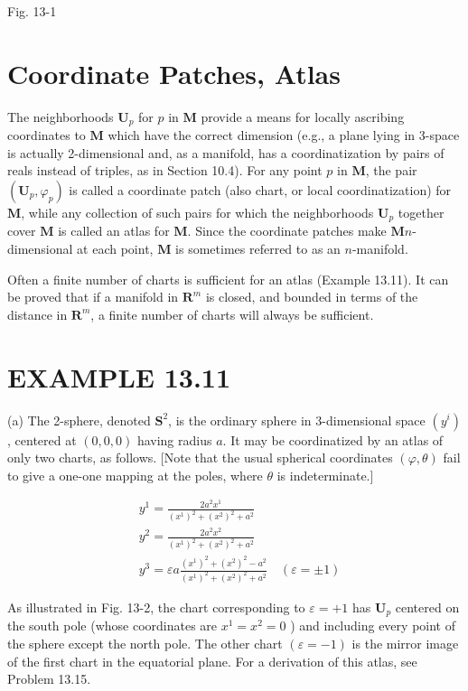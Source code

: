 \documentclass[10pt]{article}
\begin{document}
Fig. 13-1

\section*{Coordinate Patches, Atlas}
The neighborhoods $\mathbf{U}_{p}$ for $p$ in $\mathbf{M}$ provide a means for locally ascribing coordinates to $\mathbf{M}$ which have the correct dimension (e.g., a plane lying in 3-space is actually 2-dimensional and, as a manifold, has a coordinatization by pairs of reals instead of triples, as in Section 10.4). For any point $p$ in $\mathbf{M}$, the pair $\left(\mathbf{U}_{p}, \varphi_{p}\right)$ is called a coordinate patch (also chart, or local coordinatization) for $\mathbf{M}$, while any collection of such pairs for which the neighborhoods $\mathbf{U}_{p}$ together cover $\mathbf{M}$ is called an atlas for $\mathbf{M}$. Since the coordinate patches make $\mathbf{M} n$-dimensional at each point, $\mathbf{M}$ is sometimes referred to as an $n$-manifold.

Often a finite number of charts is sufficient for an atlas (Example 13.11). It can be proved that if a manifold in $\mathbf{R}^{m}$ is closed, and bounded in terms of the distance in $\mathbf{R}^{m}$, a finite number of charts will always be sufficient.

\section*{EXAMPLE 13.11}
(a) The 2-sphere, denoted $\mathbf{S}^{2}$, is the ordinary sphere in 3-dimensional space $\left(y^{i}\right)$, centered at $(0,0,0)$ having radius $a$. It may be coordinatized by an atlas of only two charts, as follows. [Note that the usual spherical coordinates $(\varphi, \theta)$ fail to give a one-one mapping at the poles, where $\theta$ is indeterminate.]

$$
\begin{aligned}
& y^{1}=\frac{2 a^{2} x^{1}}{\left(x^{1}\right)^{2}+\left(x^{2}\right)^{2}+a^{2}} \\
& y^{2}=\frac{2 a^{2} x^{2}}{\left(x^{1}\right)^{2}+\left(x^{2}\right)^{2}+a^{2}} \\
& y^{3}=\varepsilon a \frac{\left(x^{1}\right)^{2}+\left(x^{2}\right)^{2}-a^{2}}{\left(x^{1}\right)^{2}+\left(x^{2}\right)^{2}+a^{2}} \quad(\varepsilon= \pm 1)
\end{aligned}
$$

As illustrated in Fig. 13-2, the chart corresponding to $\varepsilon=+1$ has $\mathbf{U}_{p}$ centered on the south pole (whose coordinates are $x^{1}=x^{2}=0$ ) and including every point of the sphere except the north pole. The other chart $(\varepsilon=-1)$ is the mirror image of the first chart in the equatorial plane. For a derivation of this atlas, see Problem 13.15.
\end{document}
